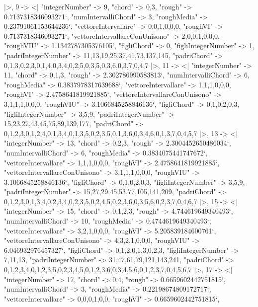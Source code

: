 \documentclass[
]{article}
\begin{document}
\begin{DatasetVerbatim}
  |>,
  9 -> <|
    "integerNumber" -> 9,
    "chord" -> {0,3},
    "rough" -> 0.7137318346093271`,
    "numIntervalliChord" -> 3,
    "roughMedia" -> 0.23791061153644236`,
    "vettoreIntervallare" -> {0,0,1,0,0,0},
    "roughVI" -> 0.7137318346093271`,
    "vettoreIntervallareConUnisono" -> {2,0,0,1,0,0,0},
    "roughVIU" -> 1.1342787305376105`,
    "figliChord" -> {{0}},
    "figliIntegerNumber" -> {1},
    "padriIntegerNumber" -> {11,13,19,25,37,41,73,137,145},
    "padriChord" -> {{0,1,3},{0,2,3},{0,1,4},{0,3,4},{0,2,5},{0,3,5},{0,3,6},{0,3,7},{0,4,7}}
  |>,
  11 -> <|
    "integerNumber" -> 11,
    "chord" -> {0,1,3},
    "rough" -> 2.302786990583813`,
    "numIntervalliChord" -> 6,
    "roughMedia" -> 0.3837978317639688`,
    "vettoreIntervallare" -> {1,1,1,0,0,0},
    "roughVI" -> 2.4758641819921885`,
    "vettoreIntervallareConUnisono" -> {3,1,1,1,0,0,0},
    "roughVIU" -> 3.1066845258846136`,
    "figliChord" -> {{0,1},{0,2},{0,3}},
    "figliIntegerNumber" -> {3,5,9},
    "padriIntegerNumber" -> {15,23,27,43,45,75,89,139,177},
    "padriChord" -> {{0,1,2,3},{0,1,2,4},{0,1,3,4},{0,1,3,5},{0,2,3,5},{0,1,3,6},{0,3,4,6},{0,1,3,7},{0,4,5,7}}
  |>,
  13 -> <|
    "integerNumber" -> 13,
    "chord" -> {0,2,3},
    "rough" -> 2.3004452650486034`,
    "numIntervalliChord" -> 6,
    "roughMedia" -> 0.3834075441747672`,
    "vettoreIntervallare" -> {1,1,1,0,0,0},
    "roughVI" -> 2.4758641819921885`,
    "vettoreIntervallareConUnisono" -> {3,1,1,1,0,0,0},
    "roughVIU" -> 3.1066845258846136`,
    "figliChord" -> {{0,1},{0,2},{0,3}},
    "figliIntegerNumber" -> {3,5,9},
    "padriIntegerNumber" -> {15,27,29,45,53,77,105,141,209},
    "padriChord" -> {{0,1,2,3},{0,1,3,4},{0,2,3,4},{0,2,3,5},{0,2,4,5},{0,2,3,6},{0,3,5,6},{0,2,3,7},{0,4,6,7}}
  |>,
  15 -> <|
    "integerNumber" -> 15,
    "chord" -> {0,1,2,3},
    "rough" -> 4.744619649340493`,
    "numIntervalliChord" -> 10,
    "roughMedia" -> 0.4744619649340493`,
    "vettoreIntervallare" -> {3,2,1,0,0,0},
    "roughVI" -> 5.205839184600761`,
    "vettoreIntervallareConUnisono" -> {4,3,2,1,0,0,0},
    "roughVIU" -> 6.046932976457327`,
    "figliChord" -> {{0,1,2},{0,1,3},{0,2,3}},
    "figliIntegerNumber" -> {7,11,13},
    "padriIntegerNumber" -> {31,47,61,79,121,143,241},
    "padriChord" -> {{0,1,2,3,4},{0,1,2,3,5},{0,2,3,4,5},{0,1,2,3,6},{0,3,4,5,6},{0,1,2,3,7},{0,4,5,6,7}}
  |>,
  17 -> <|
    "integerNumber" -> 17,
    "chord" -> {0,4},
    "rough" -> 0.6659602442751815`,
    "numIntervalliChord" -> 3,
    "roughMedia" -> 0.22198674809172717`,
    "vettoreIntervallare" -> {0,0,0,1,0,0},
    "roughVI" -> 0.6659602442751815`,

\end{DatasetVerbatim}
\end{document}

